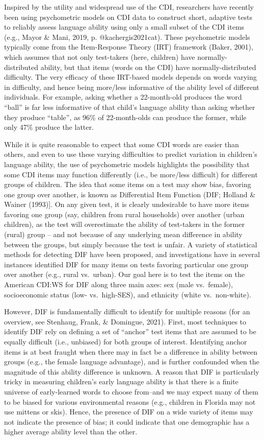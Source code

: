 \documentclass[10pt, letterpaper]{article}
\begin{document}
Inspired by the utility and widespread use of the CDI, researchers have
recently been using psychometric models on CDI data to construct short,
adaptive tests to reliably assess language ability using only a small
subset of the CDI items (e.g., Mayor \& Mani, 2019, p.
@kachergis2021cat). These psychometric models typically come from the
Item-Response Theory (IRT) framework (Baker, 2001), which assumes that
not only test-takers (here, children) have normally-distributed ability,
but that items (words on the CDI) have normally-distributed difficulty.
The very efficacy of these IRT-based models depends on words varying in
difficulty, and hence being more/less informative of the ability level
of different individuals. For example, asking whether a 22-month-old
produces the word ``ball'' is far less informative of that child's
language ability than asking whether they produce ``table'', as 96\% of
22-month-olds can produce the former, while only 47\% produce the
latter.

While it is quite reasonable to expect that some CDI words are easier
than others, and even to use these varying difficulties to predict
variation in children's language ability, the use of psychometric models
highlights the possibility that some CDI items may function differently
(i.e., be more/less difficult) for different groups of children. The
idea that some items on a test may show bias, favoring one group over
another, is known as Differential Item Function (DIF; Holland \& Wainer
(1993){]}. On any given test, it is clearly undesirable to have more
items favoring one group (say, children from rural households) over
another (urban children), as the test will overestimate the ability of
test-takers in the former (rural) group -- and not because of any
underlying mean difference in ability between the groups, but simply
because the test is unfair. A variety of statistical methods for
detecting DIF have been proposed, and investigations have in several
instances identified DIF for many items on tests favoring particular one
group over another (e.g., rural vs.~urban). Our goal here is to test the
items on the American CDI:WS for DIF along three main axes: sex (male
vs.~female), socioeconomic status (low- vs.~high-SES), and ethnicity
(white vs.~non-white).

However, DIF is fundamentally difficult to identify for multiple reasons
(for an overview, see Stenhaug, Frank, \& Domingue, 2021). First, most
techniques to identify DIF rely on defining a set of ``anchor'' test
items that are assumed to be equally difficult (i.e., unbiased) for both
groups of interest. Identifying anchor items is at best fraught when
there may in fact be a difference in ability between groups (e.g., the
female language advantage), and is further confounded when the magnitude
of this ability difference is unknown. A reason that DIF is particularly
tricky in measuring children's early language ability is that there is a
finite universe of early-learned words to choose from--and we may expect
many of them to be biased for various environmental reasons (e.g.,
children in Florida may not use mittens or skis). Hence, the presence of
DIF on a wide variety of items may not indicate the presence of bias; it
could indicate that one demographic has a higher average ability level
than the other.
\end{document}

